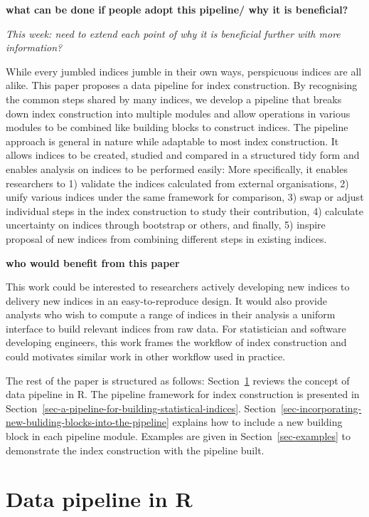 \documentclass[
]{article}
\begin{document}
\textbf{what can be done if people adopt this pipeline/ why it is
beneficial?}

\emph{This week: need to extend each point of why it is beneficial
further with more information?}

While every jumbled indices jumble in their own ways, perspicuous
indices are all alike. This paper proposes a data pipeline for index
construction. By recognising the common steps shared by many indices, we
develop a pipeline that breaks down index construction into multiple
modules and allow operations in various modules to be combined like
building blocks to construct indices. The pipeline approach is general
in nature while adaptable to most index construction. It allows indices
to be created, studied and compared in a structured tidy form and
enables analysis on indices to be performed easily: More specifically,
it enables researchers to 1) validate the indices calculated from
external organisations, 2) unify various indices under the same
framework for comparison, 3) swap or adjust individual steps in the
index construction to study their contribution, 4) calculate uncertainty
on indices through bootstrap or others, and finally, 5) inspire proposal
of new indices from combining different steps in existing indices.

\textbf{who would benefit from this paper}

This work could be interested to researchers actively developing new
indices to delivery new indices in an easy-to-reproduce design. It would
also provide analysts who wish to compute a range of indices in their
analysis a uniform interface to build relevant indices from raw data.
For statistician and software developing engineers, this work frames the
workflow of index construction and could motivates similar work in other
workflow used in practice.

The rest of the paper is structured as follows:
Section~\ref{sec-data-pipeline-in-r} reviews the concept of data
pipeline in R. The pipeline framework for index construction is
presented in
Section~\ref{sec-a-pipeline-for-building-statistical-indices}.
Section~\ref{sec-incorporating-new-buliding-blocks-into-the-pipeline}
explains how to include a new building block in each pipeline module.
Examples are given in Section~\ref{sec-examples} to demonstrate the
index construction with the pipeline built.

\hypertarget{sec-data-pipeline-in-r}{%
\section{Data pipeline in R}\label{sec-data-pipeline-in-r}}
\end{document}

